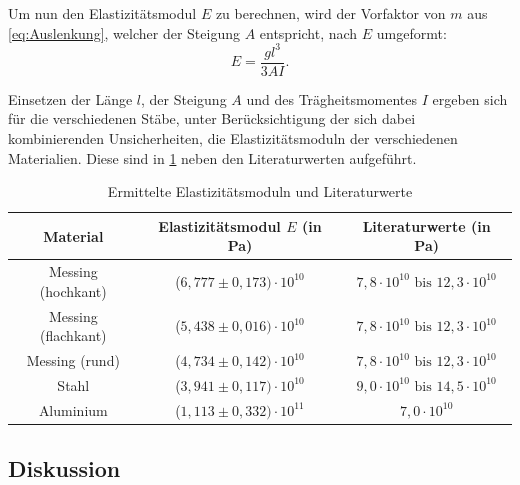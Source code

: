 	Um nun den Elastizitätsmodul $E$ zu berechnen, wird der Vorfaktor von $m$ aus \cref{eq:Auslenkung}, welcher der Steigung $A$ entspricht, nach $E$ umgeformt:
	\begin{equation}
	E = \frac{gl^3}{3AI}.
	\end{equation}
	
	Einsetzen der Länge $l$, der Steigung $A$ und des Trägheitsmomentes $I$ ergeben sich für die verschiedenen Stäbe, unter Berücksichtigung der sich dabei kombinierenden Unsicherheiten, die Elastizitätsmoduln der verschiedenen Materialien. Diese sind in \cref{tab:Elastizitätsmoduln} neben den Literaturwerten aufgeführt.
	\begin{table}[ht]
		\caption{Ermittelte Elastizitätsmoduln und Literaturwerte}
		\centering
		\label{tab:Elastizitätsmoduln}
		\begin{tabular}{c|c|c}
			{Material} & {Elastizitätsmodul $E$ (in Pa)} & {Literaturwerte (in Pa)} \\
			\hline
			{Messing (hochkant)} & {($6,777\pm 0,173)\cdot 10^{10}$} & {$7,8\cdot 10^{10} \text{ bis } 12,3\cdot 10^{10}$} \\
			{Messing (flachkant)} & {($5,438\pm 0,016)\cdot 10^{10}$} & {$7,8\cdot 10^{10} \text{ bis } 12,3\cdot 10^{10}$} \\
			{Messing (rund)} & {($4,734\pm 0,142)\cdot 10^{10}$} & {$7,8\cdot 10^{10} \text{ bis } 12,3\cdot 10^{10}$} \\
			{Stahl} & {($3,941\pm 0,117)\cdot 10^{10}$} & {$9,0\cdot 10^{10} \text{ bis } 14,5\cdot 10^{10}$} \\
			{Aluminium} & {($1,113\pm 0,332)\cdot 10^{11}$} & {$7,0\cdot 10^{10}$} \\	
		\end{tabular}
	\end{table}
	
	\subsection{Diskussion}
	
